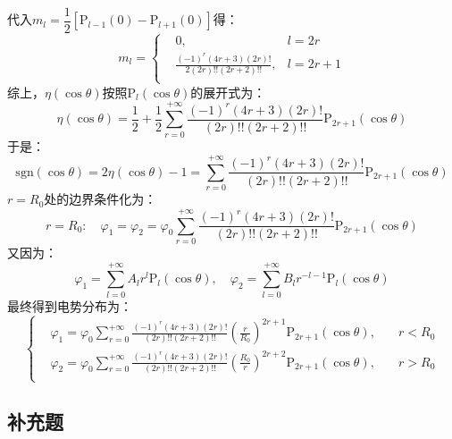 \documentclass[a4paper,fontset=none]{ctexart}
\begin{document}
\begin{itemize}
        代入$m_l=\dfrac{1}{2}\left[\mathrm{P}_{l-1}(0)-\mathrm{P}_{l+1}(0)\right]$得：
        \[
        m_l = \left\{
            \begin{aligned}
                &0,\quad &l=2r \\
                &\frac{(-1)^r(4r+3)(2r)!}{2(2r)!!(2r+2)!!}, &l=2r+1 \\
            \end{aligned}
            \right.
        \]
        综上，$\eta(\cos\theta)$按照$\mathrm{P}_l(\cos\theta)$的展开式为：
        \[
        \eta(\cos\theta) = \frac{1}{2} + \frac{1}{2}\sum_{r=0}^{+\infty}\frac{(-1)^r(4r+3)(2r)!}{(2r)!!(2r+2)!!}\mathrm{P}_{2r+1}(\cos\theta)
        \]
        于是：
        \[
        \mathrm{sgn}(\cos\theta) = 2\eta(\cos\theta) - 1 = \sum_{r=0}^{+\infty}\frac{(-1)^r(4r+3)(2r)!}{(2r)!!(2r+2)!!}\mathrm{P}_{2r+1}(\cos\theta)
        \]
        $r=R_0$处的边界条件化为：
        \[
        r = R_0:\quad \varphi_1 = \varphi_2 = \varphi_0\sum_{r=0}^{+\infty}\frac{(-1)^r(4r+3)(2r)!}{(2r)!!(2r+2)!!}\mathrm{P}_{2r+1}(\cos\theta)
        \]
        又因为：
        \[
        \varphi_1 = \sum_{l=0}^{+\infty}A_l r^l\mathrm{P}_l(\cos\theta),\quad
        \varphi_2 = \sum_{l=0}^{+\infty}B_l r^{-l-1}\mathrm{P}_l(\cos\theta)
        \]
        最终得到电势分布为：
        \[
        \left\{
            \begin{aligned}
                &\varphi_1 = \varphi_0\sum_{r=0}^{+\infty}\frac{(-1)^r(4r+3)(2r)!}{(2r)!!(2r+2)!!}\left(\frac{r}{R_0}\right)^{2r+1}\mathrm{P}_{2r+1}(\cos\theta),\quad &r<R_0 \\
                &\varphi_2 = \varphi_0\sum_{r=0}^{+\infty}\frac{(-1)^r(4r+3)(2r)!}{(2r)!!(2r+2)!!}\left(\frac{R_0}{r}\right)^{2r+2}\mathrm{P}_{2r+1}(\cos\theta),\quad &r>R_0 \\
            \end{aligned}
        \right.
        \]

    \end{itemize}

    \subsection*{补充题}
\end{document}
